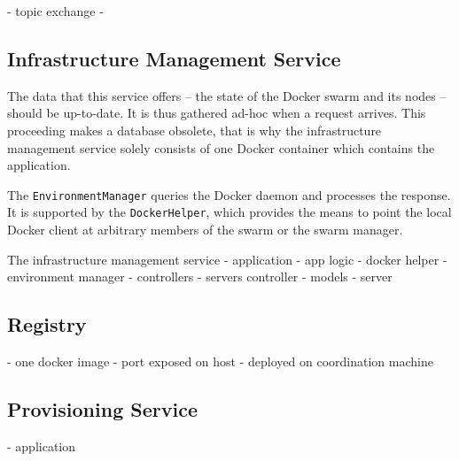       - topic exchange
        -

  \subsection{Infrastructure Management Service} %
    \label{sub:infrastructure_management_service}
      The data that this service offers -- the state of the Docker swarm and its nodes -- should be up-to-date. It is thus gathered ad-hoc when a request arrives. This proceeding makes a database obsolete, that is why the infrastructure management service solely consists of one Docker container which contains the application.

      The \texttt{EnvironmentManager} queries the Docker daemon and processes the response. It is supported by the \texttt{DockerHelper}, which provides the means to point the local Docker client at arbitrary members of the swarm or the swarm manager.



      The infrastructure management service
      - application
        - app logic
          - docker helper
          - environment manager
        - controllers
          - servers controller
        - models
          - server


  \subsection{Registry} %
    \label{sub:registry}
    - one docker image
    - port exposed on host
    - deployed on coordination machine

  \subsection{Provisioning Service} %
    \label{sub:provisioning_service}
      - application

